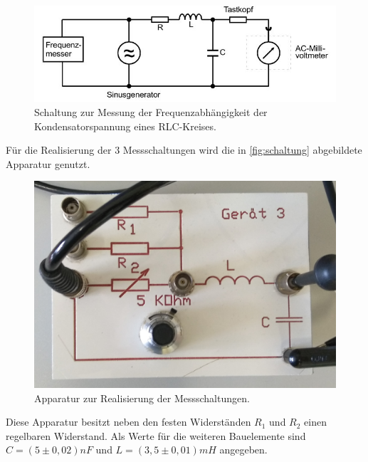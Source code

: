 \begin{figure}[H]
    \centering
    \includegraphics[width=\textwidth]{bilder/aufbauc.JPG}
    \caption{Schaltung zur Messung der Frequenzabhängigkeit der Kondensatorspannung eines RLC-Kreises. \cite{sample}}
    \label{fig:aufbauc}
  \end{figure}
\noindent
Für die Realisierung der 3 Messschaltungen wird die in \autoref{fig:schaltung} abgebildete Apparatur genutzt.
\begin{figure}[H]
    \centering
    \includegraphics[width=\textwidth]{bilder/schaltung.jpg}
    \caption{Apparatur zur Realisierung der Messschaltungen.}
    \label{fig:schaltung}
  \end{figure}
\noindent
Diese Apparatur besitzt neben den festen Widerständen $R_1$ und $R_2$ einen regelbaren Widerstand. Als Werte für die weiteren Bauelemente sind $C=(5\pm0,02) nF$ und $L=(3,5\pm0,01) mH$ angegeben.
